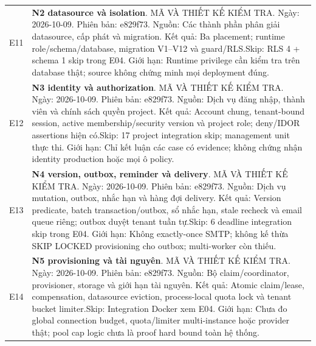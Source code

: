 \begin{longtable}{@{}P{.11\textwidth}P{.79\textwidth}@{}}
\label{ev:E11}E11 & \textbf{N2 datasource và isolation}. MÃ VÀ THIẾT KẾ KIỂM TRA. \newline Ngày: 2026-10-09. Phiên bản: e829f73. \newline Nguồn: Các thành phần phân giải datasource, cấp phát và migration. \newline Kết quả: Ba placement; runtime role\slash schema\slash database, migration V1–V12 và guard\slash RLS.\newline Skip: RLS 4 + schema 1 skip trong E04. \newline Giới hạn: Runtime privilege cần kiểm tra trên database thật; source không chứng minh mọi deployment đúng. \\
\label{ev:E12}E12 & \textbf{N3 identity và authorization}. MÃ VÀ THIẾT KẾ KIỂM TRA. \newline Ngày: 2026-10-09. Phiên bản: e829f73. \newline Nguồn: Dịch vụ đăng nhập, thành viên và chính sách quyền project. \newline Kết quả: Account chung, tenant-bound session, active membership\slash security version và project role; deny\slash IDOR assertions hiện có.\newline Skip: 17 project integration skip; management unit thực thi. \newline Giới hạn: Chỉ kết luận các case có evidence; không chứng nhận identity production hoặc mọi ô policy. \\
\label{ev:E13}E13 & \textbf{N4 version, outbox, reminder và delivery}. MÃ VÀ THIẾT KẾ KIỂM TRA. \newline Ngày: 2026-10-09. Phiên bản: e829f73. \newline Nguồn: Dịch vụ mutation, outbox, nhắc hạn và hàng đợi delivery. \newline Kết quả: Version predicate, batch transaction\slash outbox, sổ nhắc hạn, stale recheck và email queue riêng; outbox duyệt tenant tuần tự.\newline Skip: 6 deadline integration skip trong E04. \newline Giới hạn: Không exactly-once SMTP; không kế thừa SKIP LOCKED provisioning cho outbox; multi-worker còn thiếu. \\
\label{ev:E14}E14 & \textbf{N5 provisioning và tài nguyên}. MÃ VÀ THIẾT KẾ KIỂM TRA. \newline Ngày: 2026-10-09. Phiên bản: e829f73. \newline Nguồn: Bộ claim/coordinator, provisioner, storage và giới hạn tài nguyên. \newline Kết quả: Atomic claim\slash lease, compensation, datasource eviction, process-local quota lock và tenant bucket limiter.\newline Skip: Integration Docker xem E04. \newline Giới hạn: Chưa đo global connection budget, quota\slash limiter multi-instance hoặc provider thật; pool cap logic chưa là proof hard bound toàn hệ thống. \\

\end{longtable}
